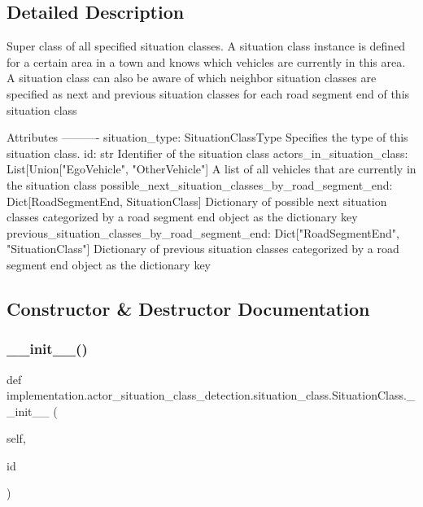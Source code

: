 \subsection{Detailed Description}
\begin{DoxyVerb}Super class of all specified situation classes. A situation class instance is defined for a certain area in a
town and knows which vehicles are currently in this area. A situation class can also be aware of which neighbor
situation classes are specified as next and previous situation classes for each road segment end of this
situation class

Attributes
----------
situation_type: SituationClassType
    Specifies the type of this situation class.
id: str
    Identifier of the situation class
actors_in_situation_class: List[Union["EgoVehicle", "OtherVehicle"]
    A list of all vehicles that are currently in the situation class
possible_next_situation_classes_by_road_segment_end: Dict[RoadSegmentEnd, SituationClass]
    Dictionary of possible next situation classes categorized by a road segment end object as the dictionary key
previous_situation_classes_by_road_segment_end: Dict["RoadSegmentEnd", "SituationClass"]
    Dictionary of previous situation classes categorized by a road segment end object as the dictionary key
\end{DoxyVerb}
 

\subsection{Constructor \& Destructor Documentation}
\mbox{\label{classimplementation_1_1actor__situation__class__detection_1_1situation__class_1_1_situation_class_abf95e1ac7cb510f64a748821db95aff8}} 
\subsubsection{\texorpdfstring{\+\_\+\+\_\+init\+\_\+\+\_\+()}{\_\_init\_\_()}}
{\footnotesize\ttfamily def implementation.\+actor\+\_\+situation\+\_\+class\+\_\+detection.\+situation\+\_\+class.\+Situation\+Class.\+\_\+\+\_\+init\+\_\+\+\_\+ (\begin{DoxyParamCaption}\item[{}]{self,  }\item[{}]{id }\end{DoxyParamCaption})}




